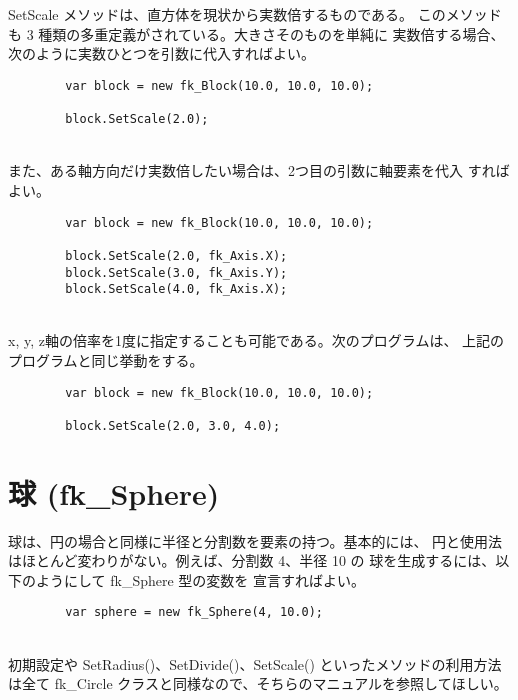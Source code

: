 SetScale メソッドは、直方体を現状から実数倍するものである。
このメソッドも 3 種類の多重定義がされている。大きさそのものを単純に
実数倍する場合、次のように実数ひとつを引数に代入すればよい。
\\
\begin{screen}
\begin{verbatim}
        var block = new fk_Block(10.0, 10.0, 10.0);

        block.SetScale(2.0);
\end{verbatim}
\end{screen}
~ \\
また、ある軸方向だけ実数倍したい場合は、2つ目の引数に軸要素を代入
すればよい。
\\
\begin{breakbox}
\begin{verbatim}
        var block = new fk_Block(10.0, 10.0, 10.0);

        block.SetScale(2.0, fk_Axis.X);
        block.SetScale(3.0, fk_Axis.Y);
        block.SetScale(4.0, fk_Axis.X);
\end{verbatim}
\end{breakbox}
~ \\
x, y, z軸の倍率を1度に指定することも可能である。次のプログラムは、
上記のプログラムと同じ挙動をする。
\\
\begin{screen}
\begin{verbatim}
        var block = new fk_Block(10.0, 10.0, 10.0);

        block.SetScale(2.0, 3.0, 4.0);

\end{verbatim}
\end{screen}

\section{球 (fk\_Sphere)}
球は、円の場合と同様に半径と分割数を要素の持つ。基本的には、
円と使用法はほとんど変わりがない。例えば、分割数 4、半径 10 の
球を生成するには、以下のようにして fk\_Sphere 型の変数を
宣言すればよい。
\\
\begin{breakbox}
\begin{verbatim}
        var sphere = new fk_Sphere(4, 10.0);
\end{verbatim}
\end{breakbox}
~ \\
初期設定や SetRadius()、SetDivide()、SetScale() といったメソッドの利用方法は全て
fk\_Circle クラスと同様なので、そちらのマニュアルを参照してほしい。

